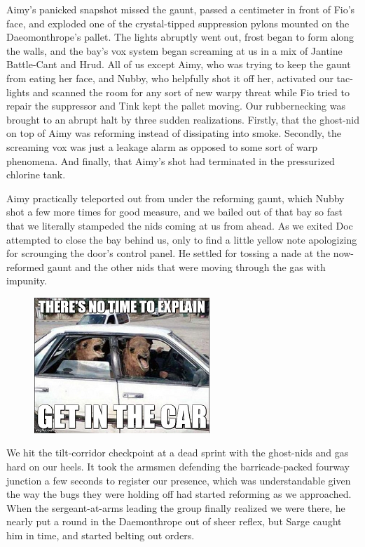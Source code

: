 Aimy's panicked snapshot missed the gaunt, passed a centimeter in front of Fio's face, and exploded one of the crystal-tipped suppression pylons mounted on the Daeomonthrope's pallet. 
The lights abruptly went out, frost began to form along the walls, and the bay's vox system began screaming at us in a mix of Jantine Battle-Cant and Hrud. 
 All of us except Aimy, who was trying to keep the gaunt from eating her face, and Nubby, who helpfully shot it off her, activated our tac-lights and scanned the room for any sort of new warpy threat while Fio tried to repair the suppressor and Tink kept the pallet moving. 
Our rubbernecking was brought to an abrupt halt by three sudden realizations. 
Firstly, that the ghost-nid on top of Aimy was reforming instead of dissipating into smoke. 
Secondly, the screaming vox was just a leakage alarm as opposed to some sort of warp phenomena. 
And finally, that Aimy's shot had terminated in the pressurized chlorine tank.

Aimy practically teleported out from under the reforming gaunt, which Nubby shot a few more times for good measure, and we bailed out of that bay so fast that we literally stampeded the nids coming at us from ahead. 
As we exited Doc attempted to close the bay behind us, only to find a little yellow note apologizing for scrounging the door's control panel. 
He settled for tossing a nade at the now-reformed gaunt and the other nids that were moving through the gas with impunity.

\begin{figure}
	\begin{center}
		\includegraphics[width=\figwidth]{pics/15/53.png}
	\end{center}
\end{figure}
We hit the tilt-corridor checkpoint at a dead sprint with the ghost-nids and gas hard on our heels. 
It took the armsmen defending the barricade-packed fourway junction a few seconds to register our presence, which was understandable given the way the bugs they were holding off had started reforming as we approached. 
When the sergeant-at-arms leading the group finally realized we were there, he nearly put a round in the Daemonthrope out of sheer reflex, but Sarge caught him in time, and started belting out orders.

